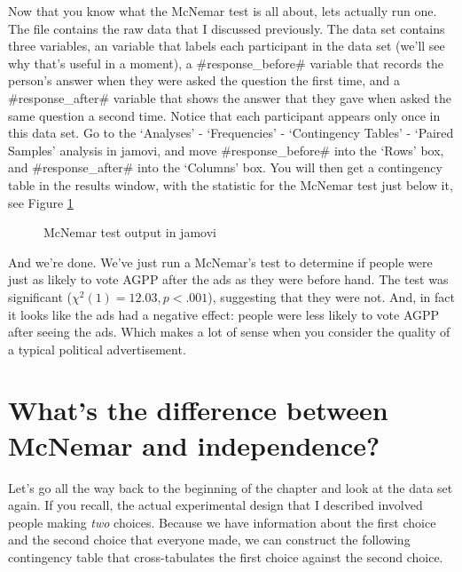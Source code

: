 
Now that you know what the McNemar test is all about, lets actually run one. The  file contains the raw data that I discussed previously. The  data set contains three variables, an  variable that labels each participant in the data set (we'll see why that's useful in a moment), a \rtextverb#response_before# variable that records the person's answer when they were asked the question the first time, and a \rtextverb#response_after# variable that shows the answer that they gave when asked the same question a second time. Notice that each participant appears only once in this data set. Go to the `Analyses' - `Frequencies' - `Contingency Tables' - `Paired Samples' analysis in jamovi, and move \rtextverb#response_before# into the `Rows' box, and \rtextverb#response_after# into the `Columns' box. You will then get a contingency table in the results window, with the statistic for the McNemar test just below it, see Figure \ref{fig:McNemar}

\vspace{1cm}
\begin{figure}[htb]
\begin{center}
\caption{McNemar test output in jamovi}
\label{fig:McNemar}
\HR
\end{center}
\end{figure}

And we're done. We've just run a McNemar's test to determine if people were just as likely to vote AGPP after the ads as they were before hand. The test was significant ($\chi^2(1) = 12.03, p<.001$), suggesting that they were not. And, in fact it looks like the ads had a negative effect: people were less likely to vote AGPP after seeing the ads. Which makes a lot of sense when you consider the quality of a typical political advertisement.

\vspace{3cm}
\section{What's the difference between McNemar and independence?}

Let's go all the way back to the beginning of the chapter and look at the  data set again. If you recall, the actual experimental design that I described involved people making {\it two} choices. Because we have information about the first choice and the second choice that everyone made, we can construct the following contingency table that cross-tabulates the first choice against the second choice.


